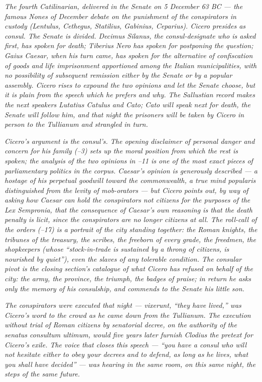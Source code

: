 
\textit{The fourth Catilinarian, delivered in the Senate on
5 December 63 BC --- the famous Nones of December debate on
the punishment of the conspirators in custody (Lentulus,
Cethegus, Statilius, Gabinius, Ceparius). Cicero presides as
consul. The Senate is divided. Decimus Silanus, the
consul-designate who is asked first, has spoken for death;
Tiberius Nero has spoken for postponing the question; Gaius
Caesar, when his turn came, has spoken for the alternative of
confiscation of goods and life imprisonment apportioned among
the Italian municipalities, with no possibility of subsequent
remission either by the Senate or by a popular assembly.
Cicero rises to expound the two opinions and let the Senate
choose, but it is plain from the speech which he prefers and
why. The Sallustian record makes the next speakers Lutatius
Catulus and Cato; Cato will speak next for death, the Senate
will follow him, and that night the prisoners will be taken
by Cicero in person to the Tullianum and strangled in turn.}

\textit{Cicero's argument is the consul's. The opening
disclaimer of personal danger and concern for his family
(--3) sets up the moral position from which the
rest is spoken; the analysis of the two opinions in
--11 is one of the most exact pieces of
parliamentary politics in the corpus. Caesar's opinion is
generously described --- a hostage of his perpetual goodwill
toward the commonwealth, a true mind \textit{popularis}
distinguished from the levity of mob-orators --- but Cicero
points out, by way of asking how Caesar can hold the
conspirators not citizens for the purposes of the Lex
Sempronia, that the consequence of Caesar's own reasoning is
that the death penalty is licit, since the conspirators are
no longer citizens at all. The roll-call of the orders
(--17) is a portrait of the city standing
together: the Roman knights, the tribunes of the treasury,
the scribes, the freeborn of every grade, the freedmen, the
shopkeepers (whose ``stock-in-trade is sustained by a throng
of citizens, is nourished by quiet''), even the slaves of any
tolerable condition. The consular pivot is the closing
section's catalogue of what Cicero has refused on behalf of
the city: the army, the province, the triumph, the badges of
praise; in return he asks only the memory of his consulship,
and commends to the Senate his little son.}

\textit{The conspirators were executed that night ---
\textit{vixerunt}, ``they have lived,'' was Cicero's word to
the crowd as he came down from the Tullianum. The execution
without trial of Roman citizens by senatorial decree, on the
authority of the senatus consultum ultimum, would five years
later furnish Clodius the pretext for Cicero's exile. The
voice that closes this speech --- ``you have a consul who will
not hesitate either to obey your decrees and to defend, as
long as he lives, what you shall have decided'' --- was
hearing in the same room, on this same night, the steps of
the same future.}
